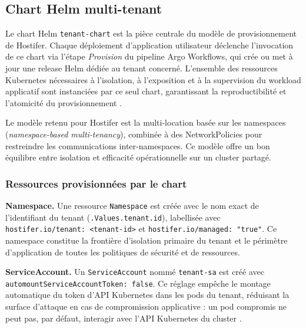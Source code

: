 \subsection{Chart Helm multi-tenant}

Le chart Helm \texttt{tenant-chart} est la pièce centrale du modèle de provisionnement de Hostifer. Chaque déploiement d'application utilisateur déclenche l'invocation de ce chart via l'étape \textit{Provision} du pipeline Argo Workflows, qui crée ou met à jour une release Helm dédiée au tenant concerné. L'ensemble des ressources Kubernetes nécessaires à l'isolation, à l'exposition et à la supervision du workload applicatif sont instanciées par ce seul chart, garantissant la reproductibilité et l'atomicité du provisionnement \cite{helm-docs}.

Le modèle retenu pour Hostifer est la multi-location basée sur les namespaces (\textit{namespace-based multi-tenancy}), combinée à des NetworkPolicies pour restreindre les communications inter-namespaces. Ce modèle offre un bon équilibre entre isolation et efficacité opérationnelle sur un cluster partagé. 

\subsubsection*{Ressources provisionnées par le chart}

\textbf{Namespace.} Une ressource \texttt{Namespace} est créée avec le nom exact de l'identifiant du tenant (\texttt{.Values.tenant.id}), labellisée avec \texttt{hostifer.io/tenant: <tenant-id>} et \texttt{hostifer.io/managed: "true"}. Ce namespace constitue la frontière d'isolation primaire du tenant et le périmètre d'application de toutes les politiques de sécurité et de ressources.

\textbf{ServiceAccount.} Un \texttt{ServiceAccount} nommé \texttt{tenant-sa} est créé avec \texttt{automountServiceAccountToken: false}. Ce réglage empêche le montage automatique du token d'API Kubernetes dans les pods du tenant, réduisant la surface d'attaque en cas de compromission applicative : un pod compromis ne peut pas, par défaut, interagir avec l'API Kubernetes du cluster \cite{k8s-security-context}.

